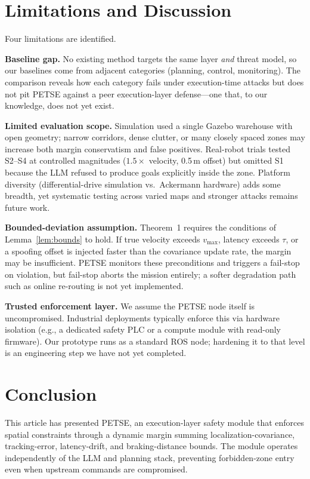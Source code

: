 \documentclass[conference]{IEEEtran}
\begin{document}
\section{Limitations and Discussion}

Four limitations are identified.

\textbf{Baseline gap.} No existing method targets the same layer \emph{and} threat model, so our baselines come from adjacent categories (planning, control, monitoring). The comparison reveals how each category fails under execution-time attacks but does not pit PETSE against a peer execution-layer defense---one that, to our knowledge, does not yet exist.

\textbf{Limited evaluation scope.} Simulation used a single Gazebo warehouse with open geometry; narrow corridors, dense clutter, or many closely spaced zones may increase both margin conservatism and false positives. Real-robot trials tested S2--S4 at controlled magnitudes ($1.5\times$ velocity, 0.5\,m offset) but omitted S1 because the LLM refused to produce goals explicitly inside the zone. Platform diversity (differential-drive simulation vs.\ Ackermann hardware) adds some breadth, yet systematic testing across varied maps and stronger attacks remains future work.

\textbf{Bounded-deviation assumption.} Theorem~1 requires the conditions of Lemma~\ref{lem:bounds} to hold. If true velocity exceeds $v_{\max}$, latency exceeds $\tau$, or a spoofing offset is injected faster than the covariance update rate, the margin may be insufficient. PETSE monitors these preconditions and triggers a fail-stop on violation, but fail-stop aborts the mission entirely; a softer degradation path such as online re-routing is not yet implemented.

\textbf{Trusted enforcement layer.} We assume the PETSE node itself is uncompromised. Industrial deployments typically enforce this via hardware isolation (e.g., a dedicated safety PLC or a compute module with read-only firmware). Our prototype runs as a standard ROS node; hardening it to that level is an engineering step we have not yet completed.

\section{Conclusion}
This article has presented PETSE, an execution-layer safety module that enforces spatial constraints through a dynamic margin summing localization-covariance, tracking-error, latency-drift, and braking-distance bounds. The module operates independently of the LLM and planning stack, preventing forbidden-zone entry even when upstream commands are compromised.
\end{document}
